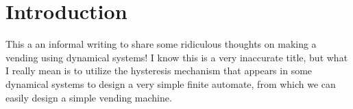 \documentclass[12pt]{article}
\begin{document}
 
  
  \vspace{-1.8cm}


\newpage

\section{Introduction}
This a an informal writing to share some ridiculous thoughts on making a vending using dynamical systems! I know this is a very inaccurate title, but what I really mean is to utilize the hysteresis mechanism that appears in some dynamical systems to design a very simple finite automate, from which we can easily design a simple vending machine.   
\end{document}
